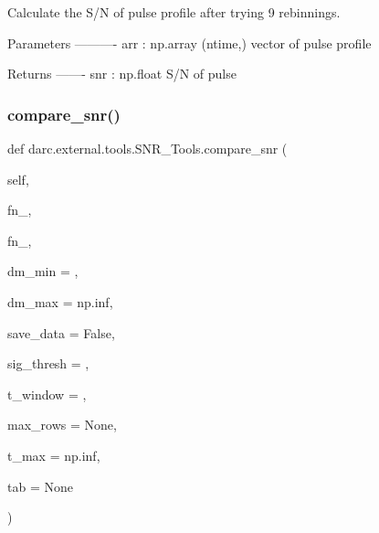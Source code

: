 \begin{DoxyVerb}Calculate the S/N of pulse profile after 
trying 9 rebinnings.

Parameters
----------
arr   : np.array
    (ntime,) vector of pulse profile 

Returns
-------
snr : np.float 
    S/N of pulse
\end{DoxyVerb}
 \mbox{\label{classdarc_1_1external_1_1tools_1_1_s_n_r___tools_a40765ebd3feabd12ad928534625000f6}} 
\subsubsection{\texorpdfstring{compare\_snr()}{compare\_snr()}}
{\footnotesize\ttfamily def darc.\+external.\+tools.\+S\+N\+R\+\_\+\+Tools.\+compare\+\_\+snr (\begin{DoxyParamCaption}\item[{}]{self,  }\item[{}]{fn\+\_,  }\item[{}]{fn\+\_,  }\item[{}]{dm\+\_\+min = {},  }\item[{}]{dm\+\_\+max = {\ttfamily np.inf},  }\item[{}]{save\+\_\+data = {\ttfamily False},  }\item[{}]{sig\+\_\+thresh = {},  }\item[{}]{t\+\_\+window = {},  }\item[{}]{max\+\_\+rows = {\ttfamily None},  }\item[{}]{t\+\_\+max = {\ttfamily np.inf},  }\item[{}]{tab = {\ttfamily None} }\end{DoxyParamCaption})}

